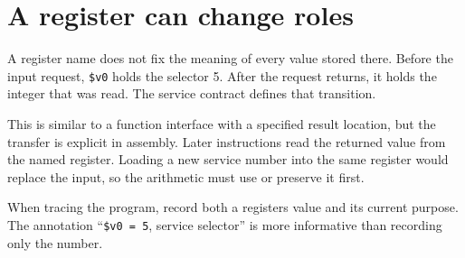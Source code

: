 \section{A register can change
  roles}\label{001-console-calculation-p07-a-register-can-change-roles}

A register name does not fix the meaning of every value stored there.
Before the input request, \texttt{\$v0} holds the selector 5. After the
request returns, it holds the integer that was read. The service
contract defines that transition.

This is similar to a function interface with a specified result
location, but the transfer is explicit in assembly. Later instructions
read the returned value from the named register. Loading a new service
number into the same register would replace the input, so the arithmetic
must use or preserve it first.

When tracing the program, record both a register\textquotesingle s value
and its current purpose. The annotation ``\texttt{\$v0\ =\ 5}, service
selector'' is more informative than recording only the number.
